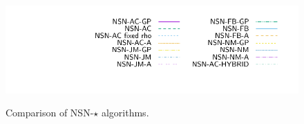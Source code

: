 \begin{figure}
   \\
{\includegraphics[height=\legendheight]{../figure/NSN/1.0e-08/50/time/profile-Chain_legend.pdf}} 
  \caption{Comparison of {\sf NSN-$\star$} algorithms.}
  \label{fig:NSN}
\end{figure}




